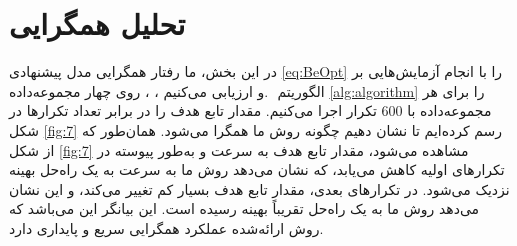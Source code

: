 \section{تحلیل همگرایی }
در این بخش، ما رفتار همگرایی مدل پیشنهادی \eqref{eq:BeOpt} را با انجام آزمایش‌هایی بر روی چهار مجموعه‌داده 
‎، ،  و 
ارزیابی می‌کنیم.
‎ الگوریتم \ref{alg:algorithm} را برای هر مجموعه‌داده با 600 تکرار اجرا می‌کنیم. مقدار تابع هدف را در برابر تعداد تکرارها در شکل \ref{fig:7} رسم کرده‌ایم تا نشان دهیم چگونه روش ما‌ همگرا می‌شود. همان‌طور که از شکل \ref{fig:7} مشاهده می‌شود، مقدار تابع هدف به سرعت و به‌طور پیوسته در تکرارهای اولیه کاهش می‌یابد، که نشان می‌دهد روش ما به سرعت به یک راه‌حل بهینه نزدیک می‌شود. در تکرارهای بعدی، مقدار تابع هدف بسیار کم تغییر می‌کند، و این نشان می‌دهد روش ما به یک راه‌حل تقریباً بهینه رسیده است. این بیانگر این می‌باشد که روش ارائه‌شده عملکرد همگرایی سریع و پایداری دارد.
